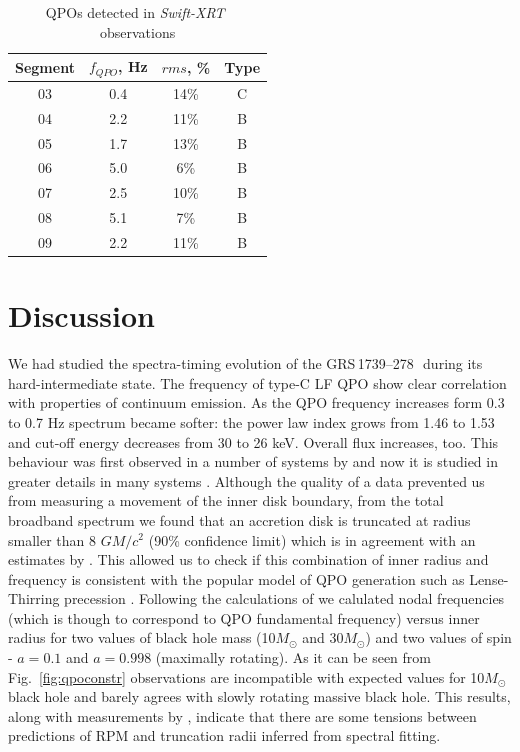 \documentclass[a4paper,fleqn,usenatbib]{mnras}
\def\grs{{GRS\,1739--278\,}}
\def\swiftx{{\em Swift-XRT\,}}
\begin{document}
\begin{table}
\noindent
\centering
\caption{QPOs detected in \swiftx\, observations}
\label{tab:xrtqpo}
\centering
\begin{tabular}{|c|c|c|c|}
\hline\hline
Segment & $f_{QPO}$, Hz & $rms$, \% & Type\\
\hline
03  &  0.4  &  14\% & C\\
04  &  2.2 &  11\% & B\\
05  &  1.7  & 13\% & B \\ 
06  &  5.0 &   6\% & B\\
07  &  2.5 &  10\% &  B\\ 
08  &  5.1 &   7\% & B\\
09  &  2.2 &  11\% &  B\\
\hline
\end{tabular}
\end{table}

\section{Discussion}
We had studied the spectra-timing evolution of the \grs\, during its hard-intermediate state.  The frequency of type-C LF QPO show clear correlation with properties of continuum emission. As the QPO frequency increases form 0.3 to 0.7 Hz spectrum became softer: the power law index grows from 1.46 to 1.53 and cut-off energy decreases from 30 to 26 keV. Overall flux increases, too. 
This behaviour was first observed in a number of systems by \citet{dimatteo99} and now it is studied in greater details in many systems \citep[see e.g.][ and many more]{vignarca03,stiele13,seifina14,fuerst16_gx339}. Although the quality of a data prevented us from measuring a movement of the inner disk boundary, from the total broadband spectrum we found that an accretion disk is truncated at radius smaller than 8 $GM/c^{2}$ (90\% confidence limit) which is in agreement with an estimates by \citet{miller15_nust}. This allowed us to check if this combination of inner radius and frequency is consistent with the popular model of QPO generation such as Lense-Thirring precession \citep{ingram09}. Following the calculations of \citet{ingram14} we calulated nodal frequencies (which is though to correspond to QPO fundamental frequency) versus inner radius for two values of black hole mass (10$M_{\odot}$ and 30$M_{\odot}$) and two values of spin - $a=0.1$ and $a=0.998$ (maximally rotating). As it can be seen from Fig.~\ref{fig:qpoconstr} observations are incompatible with expected values for 10$M_{\odot}$ black hole and barely agrees with slowly rotating massive black hole. This results, along with measurements by \cite{fuerst16_gx339}, indicate that there are some tensions between predictions of RPM and truncation radii inferred from spectral fitting.
\end{document}
